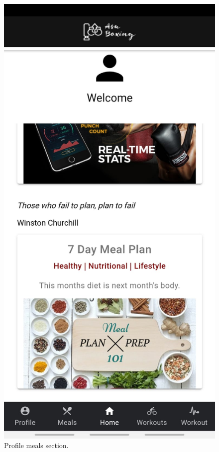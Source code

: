 \documentclass[a4paper,12pt]{report}
\begin{document}
\begin{figure}[ht] 
  \begin{minipage}[b]{0.5\linewidth}
    \centering
    \includegraphics[width=.7\linewidth]{images/aplicationImages/homePageBottom.jpeg} 
    \caption{Profile meals section.} 
    \vspace{4ex}
  \end{minipage}%
  \begin{minipage}[b]{0.5\linewidth}
    \centering

\end{minipage}
\end{figure}
\end{document}

